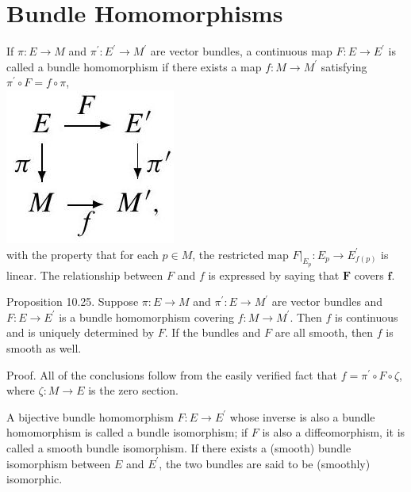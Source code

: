 \documentclass[10pt, letterpaper]{article}
\begin{document}
\section*{Bundle Homomorphisms}
If $\pi: E \rightarrow M$ and $\pi^{\prime}: E^{\prime} \rightarrow M^{\prime}$ are vector bundles, a continuous map $F: E \rightarrow E^{\prime}$ is called a bundle homomorphism if there exists a map $f: M \rightarrow M^{\prime}$ satisfying $\pi^{\prime} \circ F=f \circ \pi$,\\
\includegraphics[scale=0.2, center]{2025_06_03_90f64b1a1e243cccc2e0g-279}\\
with the property that for each $p \in M$, the restricted map $\left.F\right|_{E_{p}}: E_{p} \rightarrow E_{f(p)}^{\prime}$ is linear. The relationship between $F$ and $f$ is expressed by saying that $\boldsymbol{F}$ covers $\boldsymbol{f}$.

Proposition 10.25. Suppose $\pi: E \rightarrow M$ and $\pi^{\prime}: E \rightarrow M^{\prime}$ are vector bundles and $F: E \rightarrow E^{\prime}$ is a bundle homomorphism covering $f: M \rightarrow M^{\prime}$. Then $f$ is continuous and is uniquely determined by $F$. If the bundles and $F$ are all smooth, then $f$ is smooth as well.

Proof. All of the conclusions follow from the easily verified fact that $f=\pi^{\prime} \circ F \circ \zeta$, where $\zeta: M \rightarrow E$ is the zero section.

A bijective bundle homomorphism $F: E \rightarrow E^{\prime}$ whose inverse is also a bundle homomorphism is called a bundle isomorphism; if $F$ is also a diffeomorphism, it is called a smooth bundle isomorphism. If there exists a (smooth) bundle isomorphism between $E$ and $E^{\prime}$, the two bundles are said to be (smoothly) isomorphic.
\end{document}
